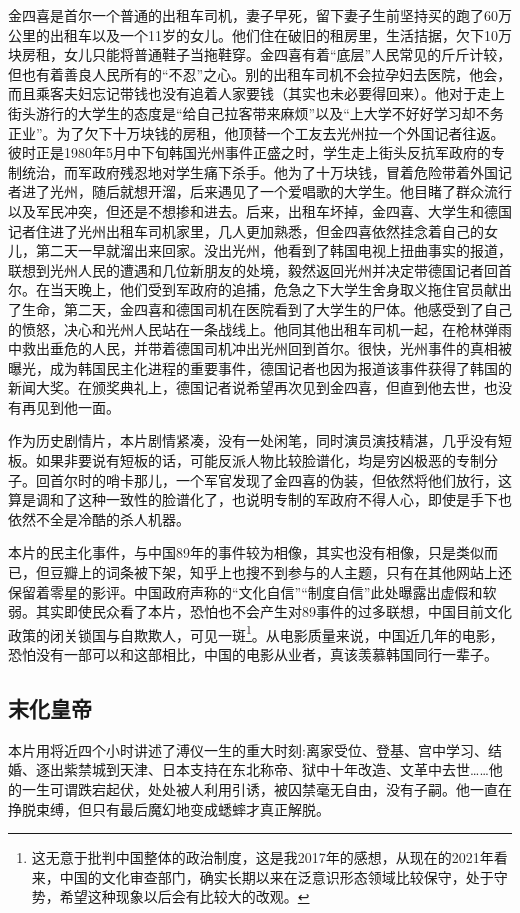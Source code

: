 金四喜是首尔一个普通的出租车司机，妻子早死，留下妻子生前坚持买的跑了60万公里的出租车以及一个11岁的女儿。他们住在破旧的租房里，生活拮据，欠下10万块房租，女儿只能将普通鞋子当拖鞋穿。金四喜有着“底层”人民常见的斤斤计较，但也有着善良人民所有的“不忍”之心。别的出租车司机不会拉孕妇去医院，他会，而且乘客夫妇忘记带钱也没有追着人家要钱（其实也未必要得回来）。他对于走上街头游行的大学生的态度是“给自己拉客带来麻烦”以及“上大学不好好学习却不务正业”。为了欠下十万块钱的房租，他顶替一个工友去光州拉一个外国记者往返。彼时正是1980年5月中下旬韩国光州事件正盛之时，学生走上街头反抗军政府的专制统治，而军政府残忍地对学生痛下杀手。他为了十万块钱，冒着危险带着外国记者进了光州，随后就想开溜，后来遇见了一个爱唱歌的大学生。他目睹了群众流行以及军民冲突，但还是不想掺和进去。后来，出租车坏掉，金四喜、大学生和德国记者住进了光州出租车司机家里，几人更加熟悉，但金四喜依然挂念着自己的女儿，第二天一早就溜出来回家。没出光州，他看到了韩国电视上扭曲事实的报道，联想到光州人民的遭遇和几位新朋友的处境，毅然返回光州并决定带德国记者回首尔。在当天晚上，他们受到军政府的追捕，危急之下大学生舍身取义拖住官员献出了生命，第二天，金四喜和德国司机在医院看到了大学生的尸体。他感受到了自己的愤怒，决心和光州人民站在一条战线上。他同其他出租车司机一起，在枪林弹雨中救出垂危的人民，并带着德国司机冲出光州回到首尔。很快，光州事件的真相被曝光，成为韩国民主化进程的重要事件，德国记者也因为报道该事件获得了韩国的新闻大奖。在颁奖典礼上，德国记者说希望再次见到金四喜，但直到他去世，也没有再见到他一面。

作为历史剧情片，本片剧情紧凑，没有一处闲笔，同时演员演技精湛，几乎没有短板。如果非要说有短板的话，可能反派人物比较脸谱化，均是穷凶极恶的专制分子。回首尔时的哨卡那儿，一个军官发现了金四喜的伪装，但依然将他们放行，这算是调和了这种一致性的脸谱化了，也说明专制的军政府不得人心，即使是手下也依然不全是冷酷的杀人机器。

本片的民主化事件，与中国89年的事件较为相像，其实也没有相像，只是类似而已，但豆瓣上的词条被下架，知乎上也搜不到参与的人主题，只有在其他网站上还保留着零星的影评。中国政府声称的“文化自信”“制度自信”此处曝露出虚假和软弱。其实即使民众看了本片，恐怕也不会产生对89事件的过多联想，中国目前文化政策的闭关锁国与自欺欺人，可见一斑\footnote{这无意于批判中国整体的政治制度，这是我2017年的感想，从现在的2021年看来，中国的文化审查部门，确实长期以来在泛意识形态领域比较保守，处于守势，希望这种现象以后会有比较大的改观。}。从电影质量来说，中国近几年的电影，恐怕没有一部可以和这部相比，中国的电影从业者，真该羡慕韩国同行一辈子。

\subsection{末化皇帝}
本片用将近四个小时讲述了溥仪一生的重大时刻:离家受位、登基、宫中学习、结婚、逐出紫禁城到天津、日本支持在东北称帝、狱中十年改造、文革中去世……他的一生可谓跌宕起伏，处处被人利用引诱，被囚禁毫无自由，没有子嗣。他一直在挣脱束缚，但只有最后魔幻地变成蟋蟀才真正解脱。

